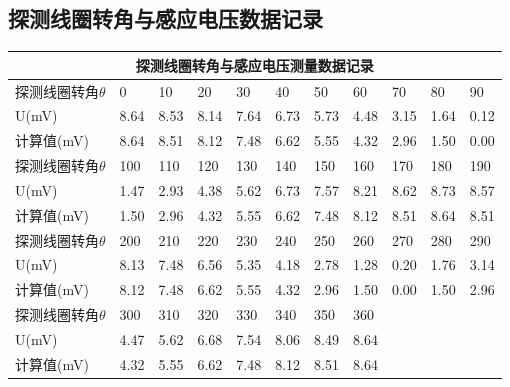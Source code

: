 \documentclass[UTF-8,twoside,cs4size]{ctexart}
\begin{document}
        \subsection{探测线圈转角与感应电压数据记录}
        \newpage
        \begin{table}[!h]
            \centering
            \begin{tabular}{|l|l|l|l|l|l|l|l|l|l|l|}
            \hline
                \multicolumn{11}{|c|}{探测线圈转角与感应电压测量数据记录} \\ \hline
                探测线圈转角$\theta$ & 0 & 10 & 20 & 30 & 40 & 50 & 60 & 70 & 80 & 90 \\ \hline
                U(mV) & 8.64 & 8.53 & 8.14 & 7.64 & 6.73 & 5.73 & 4.48 & 3.15 & 1.64 & 0.12 \\ \hline
                计算值(mV) & 8.64 & 8.51& 8.12 & 7.48 & 6.62 & 5.55 & 4.32 & 2.96 & 1.50 & 0.00 \\ \hline
                探测线圈转角$\theta$ & 100 & 110 & 120 & 130 & 140 & 150 & 160 & 170 & 180 & 190 \\ \hline
                U(mV) & 1.47 & 2.93 & 4.38 & 5.62 & 6.73 & 7.57 & 8.21 & 8.62 & 8.73 & 8.57\\ \hline
                计算值(mV) & 1.50 & 2.96 &4.32& 5.55 & 6.62 & 7.48 & 8.12 & 8.51 & 8.64 & 8.51 \\ \hline
                探测线圈转角$\theta$ & 200 & 210 & 220 & 230 & 240 & 250 & 260 & 270 & 280 & 290 \\ \hline
                U(mV) & 8.13 & 7.48 & 6.56 & 5.35 & 4.18 & 2.78 & 1.28 & 0.20 & 1.76 & 3.14\\ \hline
                计算值(mV) & 8.12 & 7.48 & 6.62 & 5.55 & 4.32 & 2.96 & 1.50 & 0.00 & 1.50 &2.96\\ \hline
                探测线圈转角$\theta$ & 300 & 310 & 320 & 330 & 340 & 350 & 360 & ~ & ~& ~ \\ \hline
                U(mV) & 4.47 & 5.62 & 6.68 & 7.54 & 8.06 & 8.49 & 8.64 & ~ & ~ & ~\\ \hline
                计算值(mV) & 4.32 & 5.55 & 6.62 & 7.48 & 8.12 & 8.51 & 8.64 & ~ & ~ & ~ \\ \hline
            \end{tabular}
        \end{table}
\end{document}
